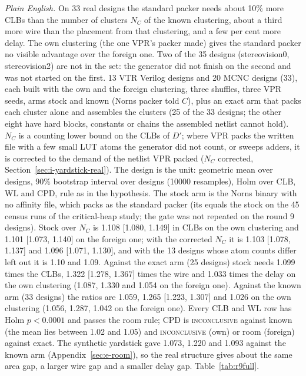  \emph{Plain English.} On 33 real designs the standard packer needs about 10\% more CLBs than the number of clusters $N_C$ of the known clustering, about a third more wire than the placement from that clustering, and a few per cent more delay. The own clustering (the one VPR's packer made) gives the standard packer no visible advantage over the foreign one. Two of the 35 designs (stereovision0, stereovision2) are not in the set: the generator did not finish on the second and was not started on the first.
 13 VTR Verilog designs and 20 MCNC designs (33), each built with the own and the foreign clustering, three shuffles, three VPR seeds, arms stock and known (Norns packer told $C$), plus an exact arm that packs each cluster alone and assembles the clusters (25 of the 33 designs; the other eight have hard blocks, constants or chains the assembled netlist cannot hold). $N_C$ is a counting lower bound on the CLBs of $D'$; where VPR packs the written file with a few small LUT atoms the generator did not count, or sweeps adders, it is corrected to the demand of the netlist VPR packed ($N_C$ corrected, Section~\ref{sec:i-yardstick-real}). The design is the unit: geometric mean over designs, 90\% bootstrap interval over designs (10000 resamples), Holm over CLB, WL and CPD, rule as in the hypothesis. The stock arm is the Norns binary with no affinity file, which packs as the standard packer (its  equals the stock  on the 45 census runs of the critical-heap study; the gate was not repeated on the round 9 designs).
 Stock over $N_C$ is 1.108 [1.080, 1.149] in CLBs on the own clustering and 1.101 [1.073, 1.140] on the foreign one; with the corrected $N_C$ it is 1.103 [1.078, 1.137] and 1.096 [1.071, 1.130], and with the 13 designs whose atom counts differ left out it is 1.10 and 1.09. Against the exact arm (25 designs) stock needs 1.099 times the CLBs, 1.322 [1.278, 1.367] times the wire and 1.033 times the delay on the own clustering (1.087, 1.330 and 1.054 on the foreign one). Against the known arm (33 designs) the ratios are 1.059, 1.265 [1.223, 1.307] and 1.026 on the own clustering (1.056, 1.287, 1.042 on the foreign one). Every CLB and WL row has Holm $p<0.0001$ and passes the room rule; CPD is \textsc{inconclusive} against known (the mean lies between 1.02 and 1.05) and \textsc{inconclusive} (own) or room (foreign) against exact. The synthetic yardstick gave 1.073, 1.220 and 1.093 against the known arm (Appendix~\ref{sec:e-room}), so the real structure gives about the same area gap, a larger wire gap and a smaller delay gap. Table~\ref{tab:r9full}.
